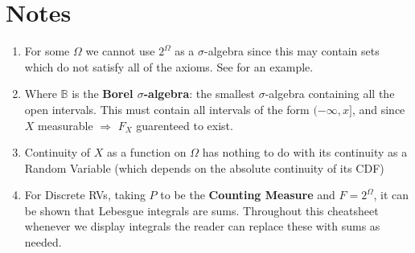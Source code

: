 \documentclass[a4paper,portrait,columns=2, hidelinks]{cheatsheet}
\begin{document}

\newpage

\section{Notes}
\begin{enumerate}
	\item \label{sec:ft1} For some \(\Omega\) we cannot use \(2^{\Omega}\) as a \(\sigma\)-algebra since this may contain sets which do not satisfy all of the axioms. See \cite{Rosenthal2006} for an example.
	\item \label{sec:ft2} Where $\mathbb{B}$ is the \textbf{Borel \(\sigma\)-algebra}: the smallest \(\sigma\)-algebra containing all the open intervals. This must contain all intervals of the form \((-\infty, x]\), and since \(X\) measurable \(\Rightarrow\) \(F_X\) guarenteed to exist.
	\item \label{sec:ft3} Continuity of \(X\) as a function on \(\Omega\) has nothing to do with its continuity as a Random Variable (which depends on the absolute continuity of its CDF) \cite{976739}
	\item \label{sec:ft4} For Discrete RVs, taking \(P\) to be the \textbf{Counting Measure} and \(F=2^{\Omega}\), it can be shown that Lebesgue integrals are sums. Throughout this cheatsheet whenever we display integrals the reader can replace these with sums as needed.
\end{enumerate}



\end{document}

